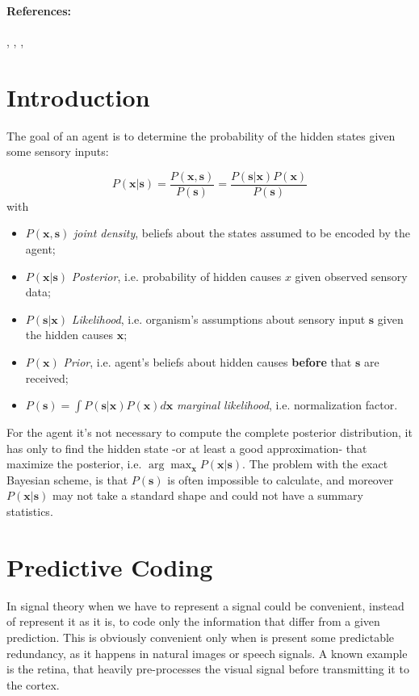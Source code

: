 \documentclass[a4paper, 10pt]{article}
\begin{document}
\paragraph{\textbf{References:}} 
\cite{Baltieri2019}, \cite{Buckley2017}, \cite{Bogacz2017},

\section{Introduction}
The goal of an agent is to determine the probability of the hidden states given some sensory inputs:

\begin{equation}
P(\mathbf{x}|\mathbf{s}) = \frac{P(\mathbf{x},\mathbf{s})}{P(\mathbf{s})} = \frac{P(\mathbf{s}|\mathbf{x})P(\mathbf{x})}{P(\mathbf{s})}
\end{equation}
with
\begin{itemize}

\item $P(\mathbf{x},\mathbf{s})$ \emph{joint density}, beliefs about the states assumed to be encoded by the agent;

\item $P(\mathbf{x}|\mathbf{s})$ \emph{Posterior}, i.e. probability of hidden causes $x$ given observed sensory data; 

\item $P(\mathbf{s}|\mathbf{x})$ \emph{Likelihood}, i.e. organism's assumptions about sensory input $\mathbf{s}$ given the hidden causes $\mathbf{x}$;

\item $P(\mathbf x)$ \emph{Prior}, i.e. agent's beliefs about hidden causes \textbf{before} that $\mathbf s$ are received;

\item $P(\mathbf s)=\int P(\mathbf s|\mathbf x)P(\mathbf x) d\mathbf x $ \emph{marginal likelihood}, i.e. normalization factor.

\end{itemize}

For the agent it's not necessary to compute the complete posterior distribution, it has only to find the hidden state -or at least a good approximation- that maximize the posterior, i.e. $\arg \max_{\mathbf{x}} P(\mathbf x|\mathbf s)$.
The problem with the exact Bayesian scheme, is that $P(\mathbf s)$ is often impossible to calculate, and moreover $P(\mathbf x|\mathbf s)$ may not take a standard shape and could not have a summary statistics. 
\section{Predictive Coding}
In signal theory when we have to represent a signal could be convenient, instead of represent it as it is, to code only the information that differ from a given prediction. This is obviously convenient only when is present some predictable redundancy, as it happens in natural images or speech signals.
A known example is the retina, that heavily pre-processes the visual signal before transmitting it to the cortex.
 
\end{document}
